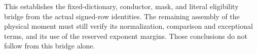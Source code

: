 This establishes the fixed-dictionary, conductor, mask, and literal
eligibility bridge from the actual signed-row identities. The remaining
assembly of the physical moment must still verify its normalization,
comparison and exceptional terms, and its use of the reserved exponent
margins. Those conclusions do not follow from this bridge alone.
